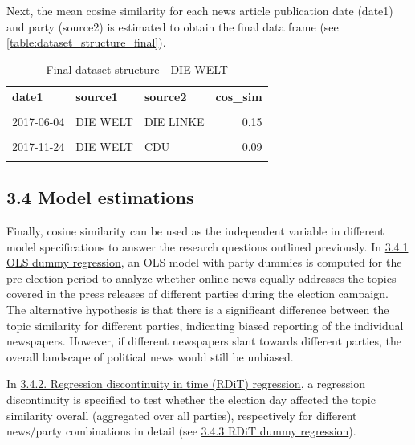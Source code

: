 \documentclass[
  12pt,
]{article}
\begin{document}
Next, the mean cosine similarity for each news article publication date
(date1) and party (source2) is estimated to obtain the final data frame
(see \autoref{table:dataset_structure_final}).

\begin{table}[H]

\caption{\label{tab:Dataset structure final}Final dataset structure - DIE WELT \label{table:dataset_structure_final}}
\centering
\fontsize{7}{9}\selectfont
\begin{tabular}[t]{lllr}
\toprule
date1 & source1 & source2 & cos\_sim\\
\midrule
\cellcolor{gray!6}{2017-10-12} & \cellcolor{gray!6}{DIE WELT} & \cellcolor{gray!6}{B90/GRÜNE} & \cellcolor{gray!6}{0.15}\\
2017-06-04 & DIE WELT & DIE LINKE & 0.15\\
\cellcolor{gray!6}{2018-01-16} & \cellcolor{gray!6}{DIE WELT} & \cellcolor{gray!6}{FDP} & \cellcolor{gray!6}{0.20}\\
2017-11-24 & DIE WELT & CDU & 0.09\\
\cellcolor{gray!6}{2017-11-25} & \cellcolor{gray!6}{DIE WELT} & \cellcolor{gray!6}{FDP} & \cellcolor{gray!6}{0.12}\\
\bottomrule
\end{tabular}
\end{table}

\hypertarget{model-estimations}{%
\subsection{3.4 Model estimations}\label{model-estimations}}

Finally, cosine similarity can be used as the independent variable in
different model specifications to answer the research questions outlined
previously. In \protect\hyperlink{ols-dummy-regression}{3.4.1 OLS dummy
regression}, an OLS model with party dummies is computed for the
pre-election period to analyze whether online news equally addresses the
topics covered in the press releases of different parties during the
election campaign. The alternative hypothesis is that there is a
significant difference between the topic similarity for different
parties, indicating biased reporting of the individual newspapers.
However, if different newspapers slant towards different parties, the
overall landscape of political news would still be unbiased.

In \protect\hyperlink{rdit}{3.4.2. Regression discontinuity in time
(RDiT) regression}, a regression discontinuity is specified to test
whether the election day affected the topic similarity overall
(aggregated over all parties), respectively for different news/party
combinations in detail (see \protect\hyperlink{rdit-dummy}{3.4.3 RDiT
dummy regression}).
\end{document}
